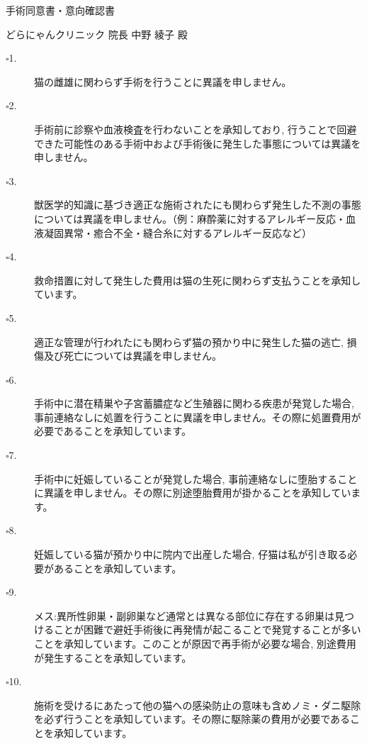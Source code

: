 \documentclass{jsarticle}
\begin{document}
\begin{center}
\Huge
\vspace{-100pt}
手術同意書・意向確認書
\end{center}

\vspace{10pt}
\Large
\noindent どらにゃんクリニック	院長	中野	綾子	殿

\vspace{10pt}
\large

\begin{description}
  \item[$\square$1.] 猫の雌雄に関わらず手術を行うことに異議を申しません。
  \item[$\square$2.] 手術前に診察や血液検査を行わないことを承知しており, 行うことで回避できた可能性のある手術中および手術後に発生した事態については異議を申しません。
  \item[$\square$3.] 獣医学的知識に基づき適正な施術されたにも関わらず発生した不測の事態については異議を申しません。（例：麻酔薬に対するアレルギー反応・血液凝固異常・癒合不全・縫合糸に対するアレルギー反応など）
  \item[$\square$4.] 救命措置に対して発生した費用は猫の生死に関わらず支払うことを承知しています。
  \item[$\square$5.] 適正な管理が行われたにも関わらず猫の預かり中に発生した猫の逃亡, 損傷及び死亡については異議を申しません。
  \item[$\square$6.] 手術中に潜在精巣や子宮蓄膿症など生殖器に関わる疾患が発覚した場合, 事前連絡なしに処置を行うことに異議を申しません。その際に処置費用が必要であることを承知しています。
  \item[$\square$7.] 手術中に妊娠していることが発覚した場合, 事前連絡なしに堕胎することに異議を申しません。その際に別途堕胎費用が掛かることを承知しています。
  \item[$\square$8.] 妊娠している猫が預かり中に院内で出産した場合, 仔猫は私が引き取る必要があることを承知しています。
  \item[$\square$9.]メス:異所性卵巣・副卵巣など通常とは異なる部位に存在する卵巣は見つけることが困難で避妊手術後に再発情が起こることで発覚することが多いことを承知しています。このことが原因で再手術が必要な場合, 別途費用が発生することを承知しています。
  \item[$\square$10.]\hspace{-5pt}施術を受けるにあたって他の猫への感染防止の意味も含めノミ・ダニ駆除を必ず行うことを承知しています。その際に駆除薬の費用が必要であることを承知しています。
\end{description}
\vspace{20pt}
\end{document}
